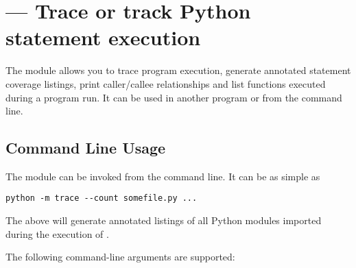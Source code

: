 \section{ ---
         Trace or track Python statement execution}


The  module allows you to trace program execution, generate
annotated statement coverage listings, print caller/callee relationships and
list functions executed during a program run.  It can be used in another
program or from the command line.

\subsection{Command Line Usage\label{trace-cli}}

The  module can be invoked from the command line.  It can be
as simple as

\begin{verbatim}
python -m trace --count somefile.py ...
\end{verbatim}

The above will generate annotated listings of all Python modules imported
during the execution of .

The following command-line arguments are supported:

